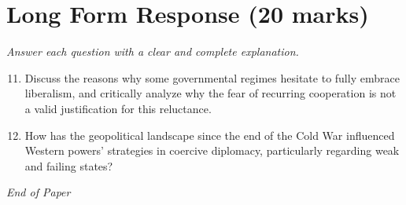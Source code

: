 \documentclass[12pt]{article}
\begin{document}
\section*{Long Form Response (20 marks)}
\textit{Answer each question with a clear and complete explanation.}
\begin{enumerate}[label=\arabic*.]
\setcounter{enumi}{10}
\item Discuss the reasons why some governmental regimes hesitate to fully embrace liberalism, and critically analyze why the fear of recurring cooperation is not a valid justification for this reluctance.
\item How has the geopolitical landscape since the end of the Cold War influenced Western powers' strategies in coercive diplomacy, particularly regarding weak and failing states?
\end{enumerate}

\vfill
\noindent\textit{End of Paper}
\end{document}
